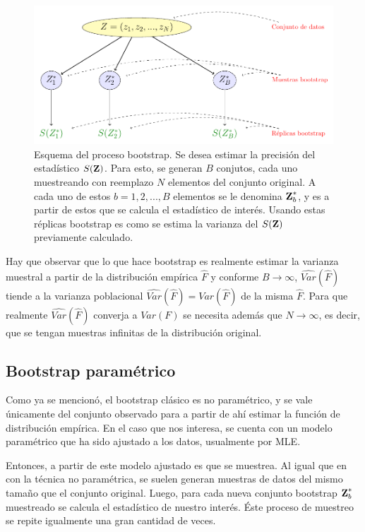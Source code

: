 \begin{figure}[tp]
  \centerline
  {\includegraphics[width=1.1\linewidth]{gfx/chap4/untitled}}        
  \caption[Esquema del proceso bootstrap.]{Esquema del proceso bootstrap. Se desea estimar la precisión del estadístico $S(\textbf{Z})$. Para esto, se generan $B$ conjutos, cada uno muestreando con reemplazo $N$ elementos del conjunto original. A cada uno de estos $b = 1, 2, ..., B$ elementos se le denomina $\textbf{Z}^{*}_b$, y es a partir de estos que se calcula el estadístico de interés. Usando estas réplicas bootstrap es como se estima la varianza del $S(\textbf{Z})$ previamente calculado.}
  \label{fig:bootesq}
\end{figure}

Hay que observar que lo que hace bootstrap es realmente estimar la varianza muestral a partir de la distribución empírica $\hat F$ y conforme $B \rightarrow \infty$, $\widehat{Var}(\hat F)$ tiende a la varianza poblacional $\widehat{Var}(\hat F) = {Var}(\hat F)$ de la misma $\hat F$. Para que realmente $\widehat{Var}(\hat F)$ converja a  ${Var}(F)$ se necesita además que $N \rightarrow \infty$, es decir, que se tengan muestras infinitas de la distribución original.

\subsection{Bootstrap paramétrico}

Como ya se mencionó, el bootstrap clásico es no paramétrico, y se vale únicamente del conjunto observado para a partir de ahí estimar la función de distribución empírica. En el caso que nos interesa, se cuenta con un modelo paramétrico que ha sido ajustado a los datos, usualmente por \ac{MLE}. 

Entonces, a partir de este modelo ajustado es que se muestrea. Al igual que en con la técnica no paramétrica, se suelen generan muestras de datos del mismo tamaño que el conjunto original. Luego, para cada nueva conjunto bootstrap $\textbf{Z}^{*}_b$ muestreado se calcula el estadístico de nuestro interés. Éste proceso de muestreo se repite igualmente una gran cantidad de veces. 

